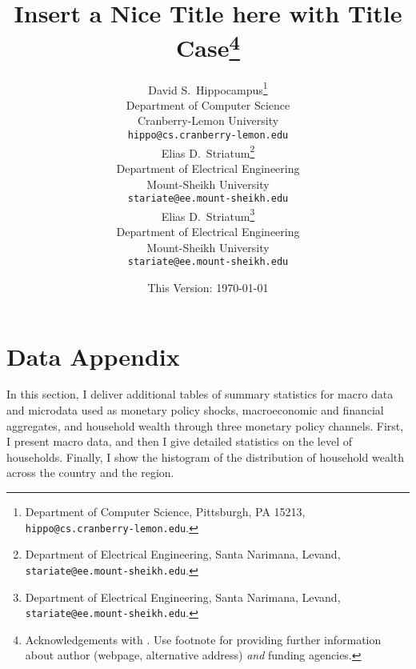 \documentclass[11pt]{article}
\date{This Version: \today}
\title{Insert a Nice Title here with Title Case\thanks{Acknowledgements with \lipsum[2]. Use footnote for providing further information about author (webpage, alternative address) \emph{and} funding agencies.}}
\author{
    {David S.~Hippocampus}\thanks{Department of Computer Science, Pittsburgh, PA 15213, \texttt{hippo@cs.cranberry-lemon.edu}.} \\
    Department of Computer Science\\
    Cranberry-Lemon University\\
    \texttt{hippo@cs.cranberry-lemon.edu} \\
    \And
    {Elias D.~Striatum}\thanks{Department of Electrical Engineering, Santa Narimana, Levand, \texttt{stariate@ee.mount-sheikh.edu}.} \\
    Department of Electrical Engineering\\
    Mount-Sheikh University\\
    \texttt{stariate@ee.mount-sheikh.edu} \\
    \AND
    {Elias D.~Striatum}\thanks{Department of Electrical Engineering, Santa Narimana, Levand, \texttt{stariate@ee.mount-sheikh.edu}.} \\
    Department of Electrical Engineering\\
    Mount-Sheikh University\\
    \texttt{stariate@ee.mount-sheikh.edu} \\
}
\begin{document}
\maketitle

\renewcommand{\thefootnote}{\arabic{footnote}}
\setcounter{footnote}{0} 


\appendix 
	\renewcommand*{\thepage}{A\arabic{page}}
	\renewcommand{\thetable}{A\arabic{table}}
	\renewcommand{\thefigure}{A\arabic{figure}}	
	
	\vspace{-3em}
	
\tableofcontents	

\section{Data Appendix}\label{app:b}
In this section, I deliver additional tables of summary statistics for macro data and microdata used as monetary policy shocks, macroeconomic and financial aggregates, and household wealth through three monetary policy channels. First, I present macro data, and then I give detailed statistics on the level of households. Finally, I show the histogram of the distribution of household wealth across the country and the region. 

%	
\end{document}
